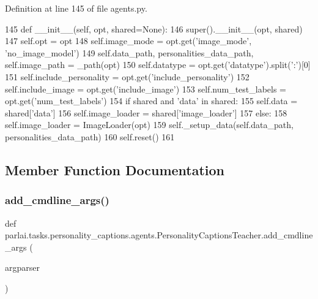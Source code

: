 Definition at line 145 of file agents.\+py.


\begin{DoxyCode}
145     \textcolor{keyword}{def }\_\_init\_\_(self, opt, shared=None):
146         super().\_\_init\_\_(opt, shared)
147         self.opt = opt
148         self.image\_mode = opt.get(\textcolor{stringliteral}{'image\_mode'}, \textcolor{stringliteral}{'no\_image\_model'})
149         self.data\_path, personalities\_data\_path, self.image\_path = \_path(opt)
150         self.datatype = opt.get(\textcolor{stringliteral}{'datatype'}).split(\textcolor{stringliteral}{':'})[0]
151         self.include\_personality = opt.get(\textcolor{stringliteral}{'include\_personality'})
152         self.include\_image = opt.get(\textcolor{stringliteral}{'include\_image'})
153         self.num\_test\_labels = opt.get(\textcolor{stringliteral}{'num\_test\_labels'})
154         \textcolor{keywordflow}{if} shared \textcolor{keywordflow}{and} \textcolor{stringliteral}{'data'} \textcolor{keywordflow}{in} shared:
155             self.data = shared[\textcolor{stringliteral}{'data'}]
156             self.image\_loader = shared[\textcolor{stringliteral}{'image\_loader'}]
157         \textcolor{keywordflow}{else}:
158             self.image\_loader = ImageLoader(opt)
159             self.\_setup\_data(self.data\_path, personalities\_data\_path)
160         self.reset()
161 
\end{DoxyCode}


\subsection{Member Function Documentation}
\mbox{\label{classparlai_1_1tasks_1_1personality__captions_1_1agents_1_1PersonalityCaptionsTeacher_a2207d2726eb0d6e8d8713b9c0c45a961}} 
\subsubsection{\texorpdfstring{add\+\_\+cmdline\+\_\+args()}{add\_cmdline\_args()}}
{\footnotesize\ttfamily def parlai.\+tasks.\+personality\+\_\+captions.\+agents.\+Personality\+Captions\+Teacher.\+add\+\_\+cmdline\+\_\+args (\begin{DoxyParamCaption}\item[{}]{argparser }\end{DoxyParamCaption})\hspace{0.3cm}{\ttfamily [static]}}

